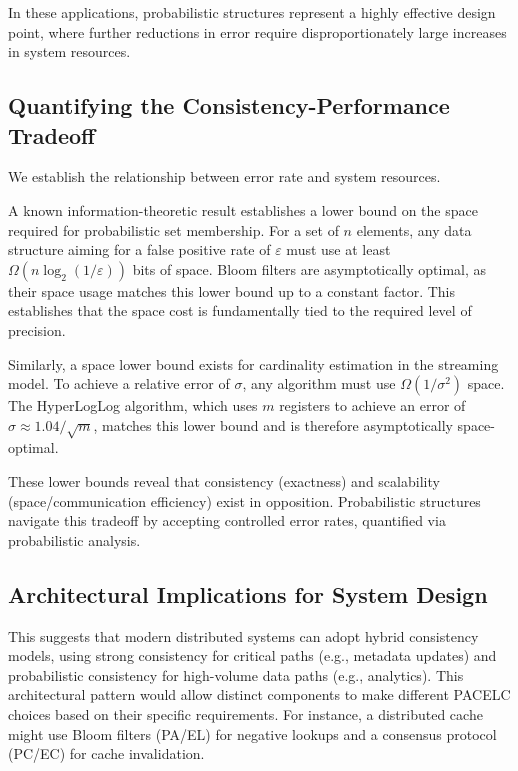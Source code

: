In these applications, probabilistic structures represent a highly effective design point, where further reductions in error require disproportionately large increases in system resources.

\subsection{Quantifying the Consistency-Performance Tradeoff}

We establish the relationship between error rate and system resources.

A known information-theoretic result establishes a lower bound on the space required for probabilistic set membership. For a set of $n$ elements, any data structure aiming for a false positive rate of $\varepsilon$ must use at least $\Omega(n \log_2(1/\varepsilon))$ bits of space. Bloom filters are asymptotically optimal, as their space usage matches this lower bound up to a constant factor. This establishes that the space cost is fundamentally tied to the required level of precision.

Similarly, a space lower bound exists for cardinality estimation in the streaming model. To achieve a relative error of $\sigma$, any algorithm must use $\Omega(1/\sigma^2)$ space. The HyperLogLog algorithm, which uses $m$ registers to achieve an error of $\sigma \approx 1.04/\sqrt{m}$, matches this lower bound and is therefore asymptotically space-optimal.

These lower bounds reveal that consistency (exactness) and scalability (space/communication efficiency) exist in opposition. Probabilistic structures navigate this tradeoff by accepting controlled error rates, quantified via probabilistic analysis.

\subsection{Architectural Implications for System Design}

This suggests that modern distributed systems can adopt hybrid consistency models, using strong consistency for critical paths (e.g., metadata updates) and probabilistic consistency for high-volume data paths (e.g., analytics). This architectural pattern would allow distinct components to make different PACELC choices based on their specific requirements. For instance, a distributed cache might use Bloom filters (PA/EL) for negative lookups and a consensus protocol (PC/EC) for cache invalidation.

